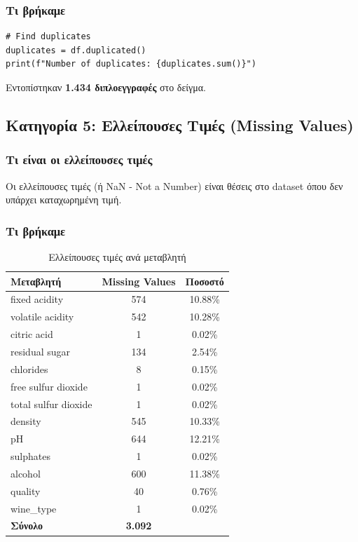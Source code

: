 \documentclass[12pt,a4paper]{article}
\begin{document}
\subsubsection{\textgreek{Τι βρήκαμε}}

\begin{lstlisting}[caption={Find duplicates}]
# Find duplicates
duplicates = df.duplicated()
print(f"Number of duplicates: {duplicates.sum()}")
\end{lstlisting}

\begin{successbox}
\textgreek{Εντοπίστηκαν} \textbf{1.434 \textgreek{διπλοεγγραφές}} \textgreek{στο δείγμα.}
\end{successbox}

\subsection{\textgreek{Κατηγορία 5: Ελλείπουσες Τιμές (Missing Values)}}

\subsubsection{\textgreek{Τι είναι οι ελλείπουσες τιμές}}

\begin{infobox}
\textgreek{Οι ελλείπουσες τιμές (ή NaN - Not a Number) είναι θέσεις στο dataset όπου δεν υπάρχει καταχωρημένη τιμή.}
\end{infobox}

\subsubsection{\textgreek{Τι βρήκαμε}}

\begin{table}[H]
\centering
\caption{\textgreek{Ελλείπουσες τιμές ανά μεταβλητή}}
\label{tab:missing}
\begin{tabular}{@{}lcc@{}}
\toprule
\textbf{\textgreek{Μεταβλητή}} & \textbf{Missing Values} & \textbf{\textgreek{Ποσοστό}} \\
\midrule
fixed acidity & 574 & 10.88\% \\
volatile acidity & 542 & 10.28\% \\
citric acid & 1 & 0.02\% \\
residual sugar & 134 & 2.54\% \\
chlorides & 8 & 0.15\% \\
free sulfur dioxide & 1 & 0.02\% \\
total sulfur dioxide & 1 & 0.02\% \\
density & 545 & 10.33\% \\
pH & 644 & 12.21\% \\
sulphates & 1 & 0.02\% \\
alcohol & 600 & 11.38\% \\
quality & 40 & 0.76\% \\
wine\_type & 1 & 0.02\% \\
\midrule
\textbf{\textgreek{Σύνολο}} & \textbf{3.092} & \\
\bottomrule
\end{tabular}
\end{table}
\end{document}
